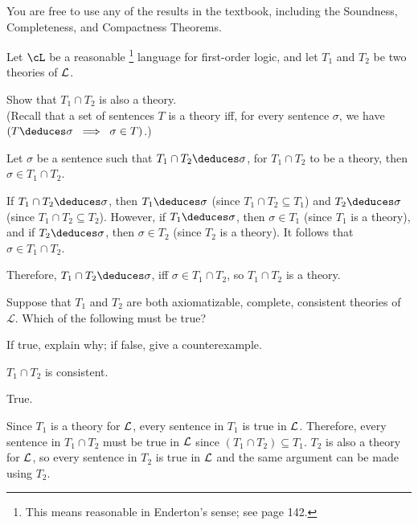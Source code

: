 \begin{problem}
  You are free to use any of the results in the textbook,
  including the Soundness, Completeness, and Compactness Theorems.

  \bigskip
  
  
  Let $\cL$ be a reasonable
  \footnote{
    This means reasonable in Enderton's sense;
    see page 142.}
  language for first-order logic, and let $T_1$ and $T_2$ be two theories of
  $\mathcal{L}$.
  \begin{enumalph}
    \item Show that $T_1 \cap T_2$ is also a theory.\\
      (Recall that a set of sentences $T$ is a theory iff,
      for every sentence $\sigma$, we have
      $(T \deduces \sigma \;\implies\; \sigma \in T)$.)
    
    \begin{Answer}
      Let $\sigma$ be a sentence such that $T_1 \cap T_2 \deduces \sigma$,
      for $T_1 \cap T_2$ to be a theory, then $\sigma \in T_1 \cap T_2$.
      
      If $T_1 \cap T_2 \deduces \sigma$, then $T_1 \deduces \sigma$
      (since $T_1 \cap T_2 \subseteq T_1$) and $T_2 \deduces \sigma$
      (since $T_1 \cap T_2 \subseteq T_2$).
      However, if $T_1 \deduces \sigma$, then $\sigma \in T_1$ (since $T_1$
      is a theory), and if $T_2 \deduces \sigma$, then $\sigma \in T_2$
      (since $T_2$ is a theory). It follows that $\sigma \in T_1 \cap T_2$.
      
      Therefore, $T_1 \cap T_2 \deduces \sigma$, iff
      $\sigma \in T_1 \cap T_2$, so $T_1 \cap T_2$ is a theory.
    \end{Answer}

    \item Suppose that $T_1$ and $T_2$ are both 
      axiomatizable, complete, consistent theories of $\mathcal L$.
      Which of the following must be true?
      
      \step
      If true, explain why; if false, give a counterexample.

      \begin{enumroman}
        \item $T_1 \cap T_2$ is consistent.
          \begin{Answer}
            True.

            Since $T_1$ is a theory for $\mathcal{L}$, every sentence in $T_1$
            is true in $\mathcal{L}$. Therefore, every sentence in $T_1 \cap T_2$
            must be true in $\mathcal{L}$ since $(T_1 \cap T_2) \subseteq T_1$.
            $T_2$ is also a theory for $\mathcal{L}$, so every sentence in $T_2$
            is true in $\mathcal{L}$ and the same argument can be made using $T_2$.


\end{Answer}
\end{enumroman}
\end{enumalph}
\end{problem}
